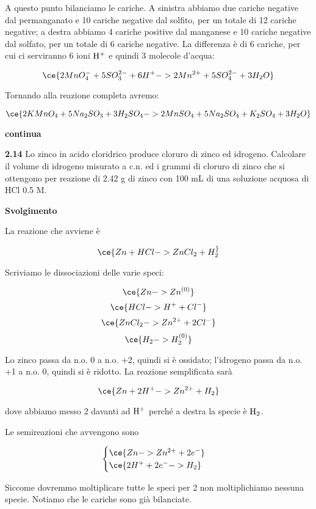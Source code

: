 A questo punto bilanciamo le cariche. A sinistra abbiamo due cariche negative dal permanganato e 10 cariche negative dal solfito, per un totale di 12 cariche negative; a destra abbiamo 4 cariche positive dal manganese e 10 cariche negative dal solfato, per un totale di 6 cariche negative. La differenza è di 6 cariche, per cui ci serviranno 6 ioni $\rm H^+$ e quindi 3 molecole d'acqua:

$$\ce{2MnO_4^- + 5SO_3^{2-} + 6H^+ -> 2Mn^{2+} + 5SO_4^{2-} + 3H_2O}$$

Tornando alla reazione completa avremo:

$$\ce{2KMnO_4 + 5Na_2SO_3 + 3H_2SO_4 -> 2MnSO_4 + 5Na_2SO_4 + K_2SO_4 + 3H_2O}$$

\textbf{continua}

\vspace{0.2cm}\textbf{2.14} Lo zinco in acido cloridrico produce cloruro di zinco ed idrogeno. Calcolare il volume di
idrogeno misurato a c.n. ed i grammi di cloruro di zinco che si ottengono per reazione di 2.42 g di zinco con 100 mL di una soluzione acquosa di HCl 0.5 M.

\vspace{0.2cm}\large\textbf{Svolgimento}\normalsize

\vspace{0.2cm}La reazione che avviene è

$$\ce{Zn + HCl -> ZnCl_2 + H_2 ^}$$

Scriviamo le dissociazioni delle varie speci:

$$\ce{Zn -> Zn^{(0)}}$$
$$\ce{HCl -> H^+ + Cl^-}$$
$$\ce{ZnCl_2 -> Zn^{2+} + 2Cl^-}$$
$$\ce{H_2 -> H_2^{(0)}}$$

Lo zinco passa da n.o. 0 a n.o. +2, quindi si è ossidato; l'idrogeno passa da n.o. +1 a n.o. 0, quindi si è ridotto. La reazione semplificata sarà

$$\ce{Zn + 2H^+ -> Zn^{2+} + H_2}$$

dove abbiamo messo 2 davanti ad $\rm H^+$ perché a destra la specie è $\rm H_2$.

Le semireazioni che avvengono sono

$$\begin{cases}
    \ce{Zn -> Zn^{2+} + 2e^-}\\
    \ce{2H^{+} + 2e^- -> H_2}
\end{cases}$$

Siccome dovremmo moltiplicare tutte le speci per 2 non moltiplichiamo nessuna specie. Notiamo che le cariche sono già bilanciate.

